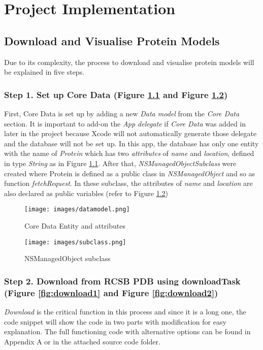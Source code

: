 \chapter{Project Implementation}
\label{ch:implementation}

\section{Download and Visualise Protein Models}
Due to its complexity, the process to download and visualise protein models will be explained in five steps.
\subsection{Step 1. Set up Core Data (Figure \ref{fig:datamodel} and Figure \ref{fig:subclass})}
First, Core Data is set up by adding a new \emph{Data model} from the \emph{Core Data} section. It is important to add-on the \emph{App delegate} if \emph{Core Data} was added in later in the project because Xcode will not automatically generate those delegate and the database will not be set up. In this app, the database has only one entity with the name of \emph{Protein} which has two \emph{attributes} of \emph{name} and \emph{location}, defined in type \emph{String} as in Figure \ref{fig:datamodel}. After that, \emph{NSManagedObjectSubclass} were created where Protein is defined as a public class in \emph{NSManagedObject} and so as function \emph{fetchRequest}.  In these subclass, the attributes of \emph{name} and \emph{location} are also declared as public variables (refer to Figure \ref{fig:subclass})
 \begin{figure}[!htp]
	\centering
	\texttt{[image: images/datamodel.png]}
	\caption{Core Data Entity and attributes}
	\label{fig:datamodel}
\end{figure}

 \begin{figure}[!htp]
	\centering
	\texttt{[image: images/subclass.png]}
	\caption{NSManagedObject subclass}
	\label{fig:subclass}
\end{figure}

\subsection{Step 2. Download from RCSB PDB using downloadTask (Figure \ref{fig:download1} and Figure \ref{fig:download2})}
\emph{Download} is the critical function in this process and since it is a long one, the code snippet will show the code in two parts with modification for easy explanation. The full functioning code with alternative options can be found in Appendix A or in the attached source code folder. 


